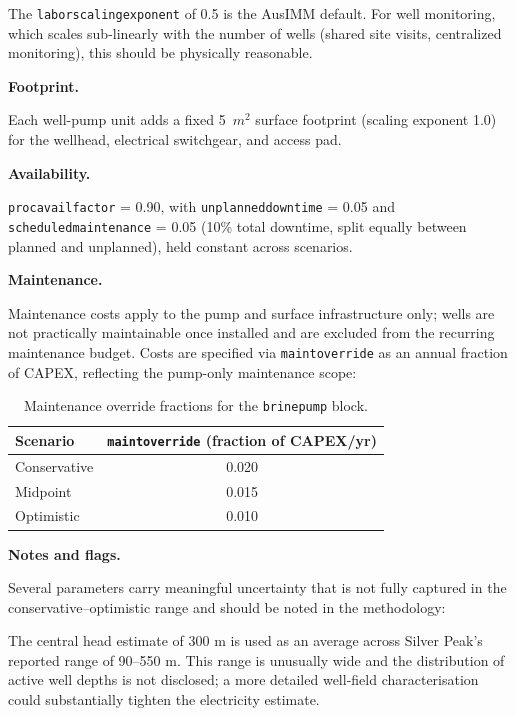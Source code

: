 \documentclass{article}
\renewcommand\_{\textunderscore\allowbreak}
\begin{document}
\noindent The \texttt{labor\_scaling\_exponent} of 0.5 is the AusIMM default. For well monitoring, which scales sub-linearly with the number of wells (shared site visits, centralized monitoring), this should be physically reasonable.

\medskip
\noindent\textbf{Footprint.}\quad

Each well-pump unit adds a fixed 5~$\si{m^2}$ surface footprint (scaling exponent 1.0) for the wellhead, electrical switchgear, and access pad.

\medskip
\noindent\textbf{Availability.}\quad

\texttt{proc\_avail\_factor} = 0.90, with \texttt{unplanned\_downtime} = 0.05 and \texttt{scheduled\_maintenance} = 0.05 (10\% total downtime, split equally between planned and unplanned), held constant across scenarios.

\medskip
\noindent\textbf{Maintenance.}\quad

Maintenance costs apply to the pump and surface infrastructure only; wells are not practically maintainable once installed and are excluded from the recurring maintenance budget. Costs are specified via \texttt{maint\_override} as an annual fraction of CAPEX, reflecting the pump-only maintenance scope:

\begin{table}[h!]
\caption{Maintenance override fractions for the \texttt{brine\_pump} block.}
\centering
\begin{tabular}{lc}
\toprule
\textbf{Scenario} & \texttt{maint\_override} (fraction of CAPEX/yr) \\
\midrule
Conservative & 0.020 \\
Midpoint     & 0.015 \\
Optimistic   & 0.010 \\
\bottomrule
\end{tabular}
\end{table}

\medskip
\noindent\textbf{Notes and flags.}\quad

Several parameters carry meaningful uncertainty that is not fully captured in the conservative--optimistic range and should be noted in the methodology:

The central head estimate of 300 m is used as an average across Silver Peak's reported range of 90--550 m. This range is unusually wide and the distribution of active well depths is not disclosed; a more detailed well-field characterisation could substantially tighten the electricity estimate.
\end{document}
